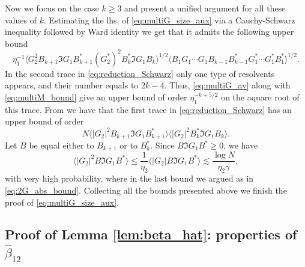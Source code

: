 \documentclass[10pt]{amsart}
\numberwithin{equation}{section}
\begin{document}
Now we focus on the case $k\ge 3$ and present a unified argument for all these values of $k$. Estimating the lhs. of \eqref{eq:multiG_size_aux} via a Cauchy-Schwarz inequality followed by Ward identity we get that it admits the following upper bound
\begin{equation}
\eta_1^{-1}\langle G_2^2 B_{k+1}\Im G_1 B_{k+1}^* (G_2^*)^2 B_k^*\Im G_1 B_k \rangle^{1/2}\langle B_1G_1\cdots G_1B_{k-1}B_{k-1}^* G_1^*\cdots G_1^* B_1^*\rangle^{1/2}.
\label{eq:reduction_Schwarz} 
\end{equation}
In the second trace in \eqref{eq:reduction_Schwarz} only one type of resolvents appears, and their number equals to $2k-4$. Thus, \eqref{eq:multiG_av} along with \eqref{eq:multiM_bound} give an upper bound of order $\eta_1^{-k+5/2}$ on the aquare root of this trace. From \cite[Eq.(5.27)]{eigenv_decorr} we have that the first trace in \eqref{eq:reduction_Schwarz} has an upper bound of order
\begin{equation}
N\langle |G_2|^2 B_{k+1}\Im G_1 B_{k+1}^*\rangle \langle |G_2|^2 B_k^*\Im G_1 B_k\rangle.
\end{equation}
Let $B$ be equal either to $B_{k+1}$ or to $B_k^*$. Since $B\Im G_1 B^*\ge 0$, we have
\begin{equation}
\langle |G_2|^2 B\Im G_1 B^*\rangle \le \frac{1}{\eta_2}\langle |G_2|B\Im G_1B^*\rangle\lesssim \frac{\log N}{\eta_2\gamma},
\end{equation}
with very high probability, where in the last bound we argued as in \eqref{eq:2G_abs_bound}. Collecting all the bounds presented above we finish the proof of \eqref{eq:multiG_size_aux}.


\subsection{Proof of Lemma \ref{lem:beta_hat}: properties of $\hat{\beta}_{12}$} \label{app:beta_hat} 
\end{document}
